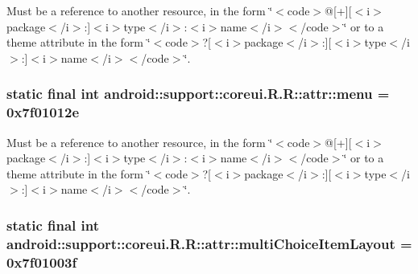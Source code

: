 Must be a reference to another resource, in the form \char`\"{}$<$code$>$@\mbox{[}+\mbox{]}\mbox{[}$<$i$>$package$<$/i$>$:\mbox{]}$<$i$>$type$<$/i$>$:$<$i$>$name$<$/i$>$$<$/code$>$\char`\"{} or to a theme attribute in the form \char`\"{}$<$code$>$?\mbox{[}$<$i$>$package$<$/i$>$:\mbox{]}\mbox{[}$<$i$>$type$<$/i$>$:\mbox{]}$<$i$>$name$<$/i$>$$<$/code$>$\char`\"{}. \hypertarget{classandroid_1_1support_1_1coreui_1_1_r_1_1attr_e86d7c219cbe60f1f49fedd8e4ab3756}{
\subsubsection[{menu}]{\setlength{\rightskip}{0pt plus 5cm}static final int android::support::coreui.R.R::attr::menu = 0x7f01012e}}
\label{classandroid_1_1support_1_1coreui_1_1_r_1_1attr_e86d7c219cbe60f1f49fedd8e4ab3756}


Must be a reference to another resource, in the form \char`\"{}$<$code$>$@\mbox{[}+\mbox{]}\mbox{[}$<$i$>$package$<$/i$>$:\mbox{]}$<$i$>$type$<$/i$>$:$<$i$>$name$<$/i$>$$<$/code$>$\char`\"{} or to a theme attribute in the form \char`\"{}$<$code$>$?\mbox{[}$<$i$>$package$<$/i$>$:\mbox{]}\mbox{[}$<$i$>$type$<$/i$>$:\mbox{]}$<$i$>$name$<$/i$>$$<$/code$>$\char`\"{}. \hypertarget{classandroid_1_1support_1_1coreui_1_1_r_1_1attr_104a87850e7b33ce2949746e3b8b6204}{
\subsubsection[{multiChoiceItemLayout}]{\setlength{\rightskip}{0pt plus 5cm}static final int android::support::coreui.R.R::attr::multiChoiceItemLayout = 0x7f01003f}}
\label{classandroid_1_1support_1_1coreui_1_1_r_1_1attr_104a87850e7b33ce2949746e3b8b6204}


